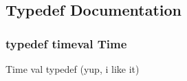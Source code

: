\subsection{Typedef Documentation}
\hypertarget{_selector_8hh_af47ac292ef7224cf549b944d138ba4ae}{
\subsubsection[{Time}]{\setlength{\rightskip}{0pt plus 5cm}typedef timeval {\bf Time}}}\label{_selector_8hh_af47ac292ef7224cf549b944d138ba4ae}
Time val typedef (yup, i like it) 
